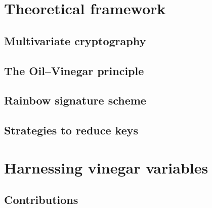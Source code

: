 \documentclass[openright]{report}
\begin{document}
\chapter{Theoretical framework}

\section{Multivariate cryptography}

\section{The Oil--Vinegar principle}

\section{Rainbow signature scheme}

\section{Strategies to reduce keys}

\chapter{Harnessing vinegar variables}

\section{Contributions}
\end{document}
